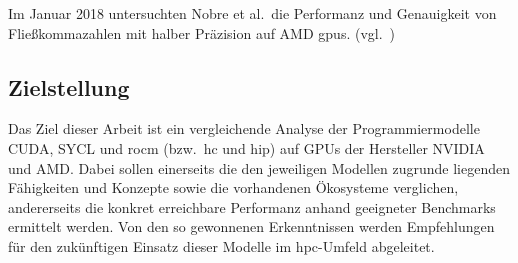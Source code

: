 Im Januar 2018 untersuchten Nobre et al.\ die Performanz und Genauigkeit von
Fließkommazahlen mit halber Präzision auf AMD \gls{gpu}s.
(vgl.~\cite{nobre2018})

\subsection{Zielstellung}
\label{einleitung:zielstellung}

Das Ziel dieser Arbeit ist ein vergleichende Analyse der Programmiermodelle
CUDA, SYCL und \gls{rocm} (bzw.\ \gls{hc} und \gls{hip}) auf GPUs der Hersteller
NVIDIA und AMD. Dabei sollen einerseits die den jeweiligen Modellen zugrunde
liegenden Fähigkeiten und Konzepte sowie die vorhandenen Ökosysteme verglichen,
andererseits die konkret erreichbare Performanz anhand geeigneter Benchmarks
ermittelt werden. Von den so gewonnenen Erkenntnissen werden Empfehlungen für 
den zukünftigen Einsatz dieser Modelle im \gls{hpc}-Umfeld abgeleitet.
